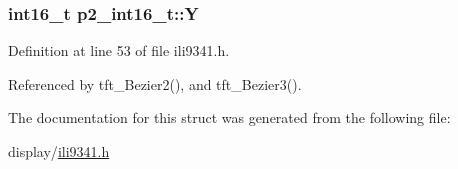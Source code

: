 \subsubsection[{\texorpdfstring{Y}{Y}}]{\setlength{\rightskip}{0pt plus 5cm}int16\+\_\+t p2\+\_\+int16\+\_\+t\+::Y}\hypertarget{structp2__int16__t_a13502352cac20adbf543b35dc25bf76c}{}\label{structp2__int16__t_a13502352cac20adbf543b35dc25bf76c}


Definition at line 53 of file ili9341.\+h.



Referenced by tft\+\_\+\+Bezier2(), and tft\+\_\+\+Bezier3().



The documentation for this struct was generated from the following file\+:\begin{DoxyCompactItemize}
\item 
display/\hyperlink{ili9341_8h}{ili9341.\+h}\end{DoxyCompactItemize}
